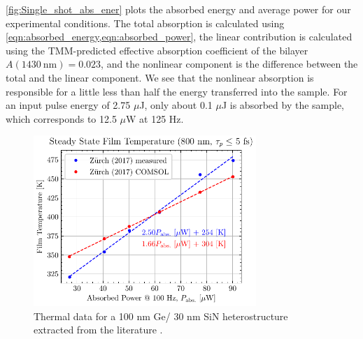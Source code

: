 \cref{fig:Single_shot_abs_ener} plots the absorbed energy and average power for our experimental conditions. The total absorption is calculated using \cref{eqn:absorbed_energy,eqn:absorbed_power}, the linear contribution is calculated using the TMM-predicted effective absorption coefficient of the bilayer $A (1430 \ \textrm{nm}) = 0.023$, and the nonlinear component is the difference between the total and the linear component. We see that the nonlinear absorption is responsible for a little less than half the energy transferred into the sample. For an input pulse energy of 2.75 $\mu$J, only about 0.1 $\mu$J is absorbed by the sample, which corresponds to 12.5 $\mu$W at 125 Hz.

\begin{figure}
	\centering
	\includegraphics[width=0.75\textwidth]{figures/chap4/COMSOL_temp_power.pdf}
	\caption{Thermal data for a 100 nm Ge/ 30 nm SiN heterostructure extracted from the literature \cite{zurchDirectSimultaneousObservation2017}.}
	\label{fig:COMSOL_temp_power}
\end{figure}


